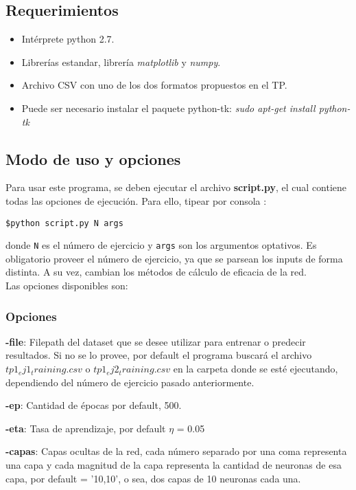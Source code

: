 \subsection{Requerimientos}
\begin{itemize}
\item Intérprete python 2.7.
\item Librerías estandar, librería \textit{matplotlib} y \textit{numpy}.
\item Archivo CSV con uno de los dos formatos propuestos en el TP. 
\item Puede ser necesario instalar el paquete python-tk:
\textit{sudo apt-get install python-tk}
\end{itemize}

\subsection{Modo de uso y opciones}
Para usar este programa, se deben ejecutar el archivo \textbf{script.py}, el cual contiene todas las opciones de ejecución. Para ello, tipear por consola :

\texttt{\$python script.py N args}

donde \texttt{N} es el número de ejercicio y \texttt{args} son los argumentos optativos. Es obligatorio proveer el número de ejercicio, ya que se parsean los inputs de forma distinta. A su vez, cambian los métodos de cálculo de eficacia de la red.\\

Las opciones disponibles son:

\subsubsection{Opciones}

\textbf{-file}: Filepath del dataset que se desee utilizar para entrenar o predecir resultados. Si no se lo provee, por default el programa buscará el archivo $tp1_ej1_training.csv$ o $tp1_ej2_training.csv$ en la carpeta donde se esté ejecutando, dependiendo del número de ejercicio pasado anteriormente.

\textbf{-ep}: Cantidad de épocas por default, 500.

\textbf{-eta}: Tasa de aprendizaje, por default $\eta$ = 0.05

\textbf{-capas}: Capas ocultas de la red, cada número separado por una coma representa una capa y cada magnitud de la capa representa la cantidad de neuronas de esa capa, por default = '10,10', o sea, dos capas de 10 neuronas cada una.

